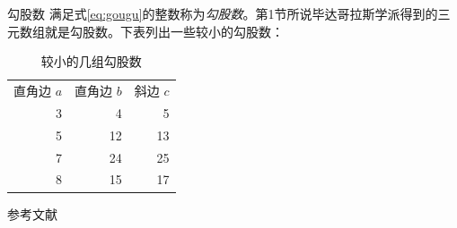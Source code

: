 \documentclass[xcolor=table]{beamer}
\begin{document}
\begin{frame}{勾股数}
满足式\eqref{eq:gougu}的整数称为\emph{勾股数}。第1节所说毕达哥拉斯学派得到的三元数组就是勾股数。下表列出一些较小的勾股数：
\begin{table}[H]
\begin{tabular}{rrr}

\rowcolor{gray}
直角边 $a$ & 直角边 $b$ & 斜边 $c$\\

3 & 4 & 5 \\
5 & 12 & 13 \\
7 & 24 & 25 \\
8 & 15 &17 \\

\end{tabular}
\caption{较小的几组勾股数}
\end{table}
\end{frame}

\begin{frame}{参考文献}
\nocite{Shiye}

\end{frame}
\end{document}
